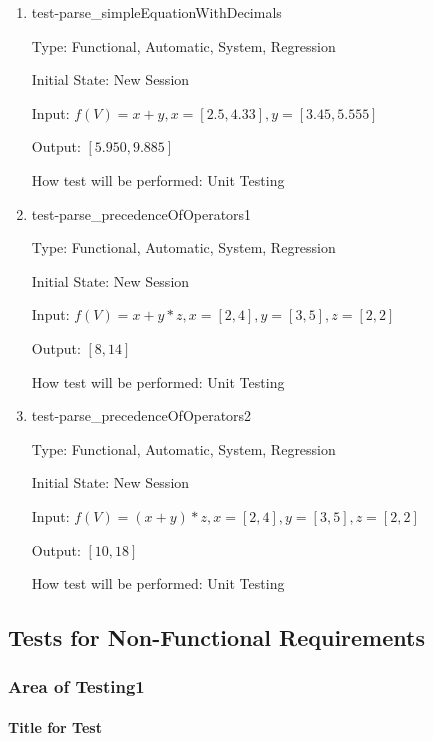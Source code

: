 \documentclass[12pt, titlepage]{article}
\begin{document}
\begin{enumerate}
	
	\item{test-parse\_simpleEquationWithDecimals}
	
	Type: Functional, Automatic, System, Regression
	
	Initial State: New Session
	
	Input: $f(V) = x + y, x = [2.5,4.33], y = [3.45,5.555]$
	
	Output: $[5.950,9.885]$
	
	How test will be performed: Unit Testing\\
	
	\item{test-parse\_precedenceOfOperators1}
	
	Type: Functional, Automatic, System, Regression
	
	Initial State: New Session
	
	Input: $f(V) = x + y * z, x = [2,4], y = [3,5], z = [2,2]$
	
	Output: $[8,14]$
	
	How test will be performed: Unit Testing\\
	
	\item{test-parse\_precedenceOfOperators2}
	
	Type: Functional, Automatic, System, Regression
	
	Initial State: New Session
	
	Input: $f(V) = (x + y) * z, x = [2,4], y = [3,5], z = [2,2]$
	
	Output: $[10,18]$
	
	How test will be performed: Unit Testing\\
	
\end{enumerate}

\subsection{Tests for Non-Functional Requirements}
\label{testplan_nonfunctional}

\subsubsection{Area of Testing1}
		
\paragraph{Title for Test}
\end{document}
